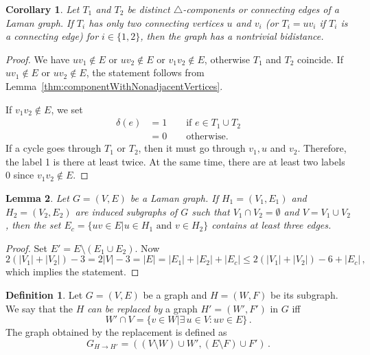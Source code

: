 \documentclass[a4paper, 11pt]{article}
\newcommand{\trcomps}{$\triangle$-components}
\newtheorem{lem}{Lemma}[section]
\newtheorem{cor}[lem]{Corollary}
\theoremstyle{definition}
\newtheorem{defn}{Definition}[section]
\begin{document}
\begin{cor}
Let $T_1$ and $T_2$ be distinct \trcomps{} or connecting edges of a Laman graph. If $T_i$ has only two connecting vertices $u$ and $v_i$ (or $T_i=uv_i$ if $T_i$ is a connecting edge) for $i\in\{1,2\}$, then  the graph has a nontrivial bidistance.
\end{cor}
\begin{proof}
We have $uv_1\notin E$ or $uv_2\notin E$ or $v_1v_2\notin E$, otherwise $T_1$ and $T_2$ coincide.
If $uv_1\notin E$ or $uv_2\notin E$, the statement follows from Lemma~\ref{thm:componentWithNonadjacentVertices}.

If $v_1v_2\notin E$, we set 
\begin{align*}
\delta(e)&=1 \qquad \text{if } e\in T_1\cup T_2 \\
		&=0 \qquad \text{otherwise.}
\end{align*} 
If a cycle goes through $T_1$ or $T_2$, then it must go through  $v_1, u$ and $v_2$. Therefore, the label 1 is there at least twice. At the same time, there are at least two labels 0 since  $v_1v_2\notin E$.
\end{proof}

\begin{lem}
\label{lem:numEdgesBetweenTwoParts}
Let $G=(V,E)$ be a Laman graph. If $H_1=(V_1,E_1)$ and $H_2=(V_2,E_2)$ are induced subgraphs of $G$ such that $V_1 \cap V_2=\emptyset$ and $V=V_1\cup V_2$, then the set $E_c=\{uv\in E | u\in H_1 \text{ and } v\in H_2\}$ contains at least three edges.
\end{lem}
\begin{proof}
Set $E'=E\setminus(E_1 \cup E_2)$. Now
$$
2(|V_1|+|V_2|)-3=2|V|-3=|E|=|E_1|+|E_2|+|E_c| \leq 2(|V_1|+|V_2|)-6 +|E_c|\,,
$$
which implies the statement.
\end{proof}

\begin{defn}
Let $G=(V,E)$ be a graph and $H=(W,F)$ be its subgraph. We say that the $H$ \emph{can be replaced by} a graph $H'=(W',F')$ in $G$ iff
$$
W'\cap V=\{v\in W | \exists\, u\in V \colon uv\in E\}\,.
$$
The graph obtained by the replacement is defined as
$$
G_{H\rightarrow H'}=\left((V\setminus W)\cup W', (E\setminus F)\cup F'\right)\,.
$$
\end{defn}
\end{document}
